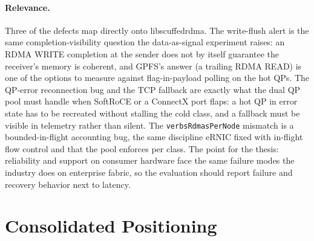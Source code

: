 \documentclass[11pt,letterpaper]{article}
\begin{document}
\paragraph{Relevance.} Three of the defects map directly onto libscuffedrdma. The write-flush alert is the same completion-visibility question the data-as-signal experiment raises: an RDMA WRITE completion at the sender does not by itself guarantee the receiver's memory is coherent, and GPFS's answer (a trailing RDMA READ) is one of the options to measure against flag-in-payload polling on the hot QPs. The QP-error reconnection bug and the TCP fallback are exactly what the dual QP pool must handle when SoftRoCE or a ConnectX port flaps: a hot QP in error state has to be recreated without stalling the cold class, and a fallback must be visible in telemetry rather than silent. The \texttt{verbsRdmasPerNode} mismatch is a bounded-in-flight accounting bug, the same discipline eRNIC fixed with in-flight flow control and that the pool enforces per class. The point for the thesis: reliability and support on consumer hardware face the same failure modes the industry does on enterprise fabric, so the evaluation should report failure and recovery behavior next to latency.

\section{Consolidated Positioning}
\end{document}
